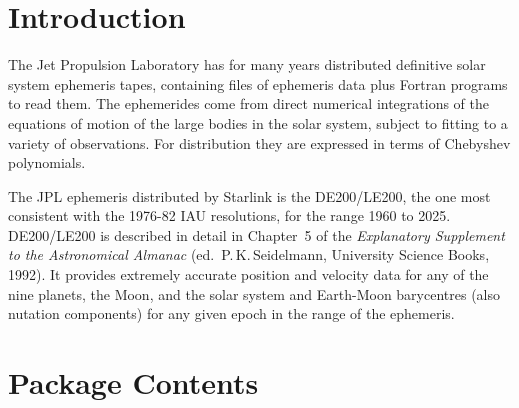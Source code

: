 \documentclass[twoside,11pt,nolof]{starlink}
\begin{document}
\scfrontmatter


\section{Introduction}
\label{introduction}

The Jet Propulsion Laboratory has for many years distributed definitive
solar system ephemeris tapes, containing files of ephemeris data
plus Fortran programs to read them.  The ephemerides come from direct
numerical integrations of the equations of motion of the large bodies
in the solar system, subject to fitting to a variety of observations.
For distribution they are expressed in terms of Chebyshev polynomials.

The JPL ephemeris distributed by Starlink is the DE200/LE200, the one most
consistent with the 1976-82 IAU resolutions, for the range 1960 to 2025.
DE200/LE200 is described in detail in Chapter~5 of the \textit{Explanatory
Supplement to the Astronomical Almanac}\/ (ed.\ P.\,K.\,Seidelmann,
University Science Books, 1992).  It provides extremely accurate position
and velocity data for any of the nine planets, the Moon, and the solar
system and Earth-Moon barycentres (also nutation components) for any
given epoch in the range of the ephemeris.

\section{Package Contents}
\label{package_contents}
\end{document}
